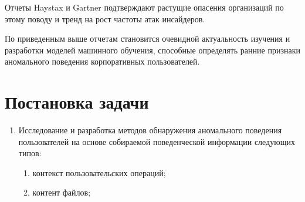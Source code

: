 Отчеты Haystax \cite{veriatoInsiderThreatReport}\cite{companyInsiderThreatReport} и Gartner \cite{EmergingInsiderThreat2018} подтверждают растущие опасения организаций по этому поводу и тренд на рост частоты атак инсайдеров.


По приведенным выше отчетам становится очевидной актуальность изучения и разработки моделей машинного обучения, способные определять ранние признаки аномального поведения корпоративных пользователей.\\

\chapter{Постановка задачи}

\begin{enumerate}
	\item Исследование и разработка методов обнаружения аномального поведения пользователей на основе собираемой поведенческой информации следующих типов:
	\begin{enumerate}
		\item контекст пользовательских операций;
		\item контент файлов;
	\end{enumerate}
\end{enumerate}